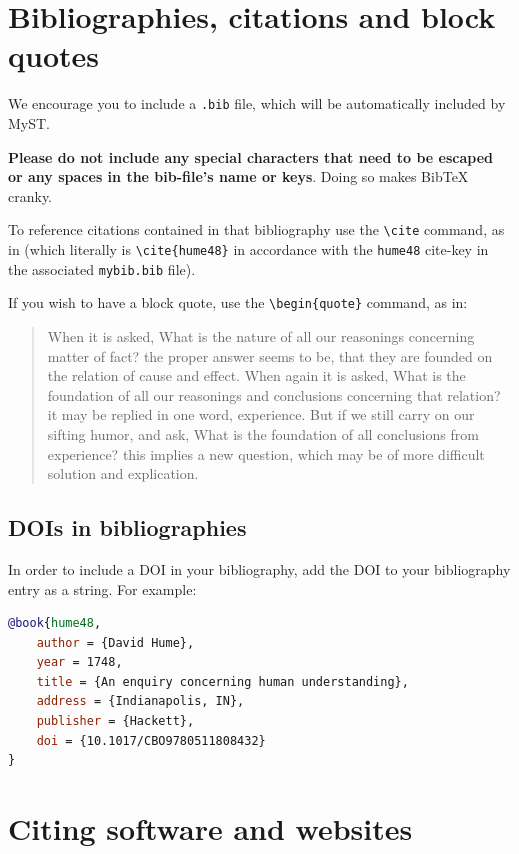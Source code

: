 \section{Bibliographies, citations and block quotes}\label{bibliographies-citations-and-block-quotes}

We encourage you to include a \texttt{.bib} file, which will be automatically included by MyST.

\textbf{Please do not include any special characters that need to be escaped or any spaces in the bib-file's name or keys}. Doing so makes BibTeX cranky.

To reference citations contained in that bibliography use the \verb|\cite| command, as in \citep{hume48} (which literally is \verb|\cite{hume48}| in accordance with the \texttt{hume48} cite-key in the associated \texttt{mybib.bib} file).

If you wish to have a block quote, use the \verb|\begin{quote}| command, as in:

\begin{quote}
    When it is asked, What is the nature of all our reasonings concerning matter of fact? the proper answer seems to be, that they are founded on the relation of cause and effect. When again it is asked, What is the foundation of all our reasonings and conclusions concerning that relation? it may be replied in one word, experience. But if we still carry on our sifting humor, and ask, What is the foundation of all conclusions from experience? this implies a new question, which may be of more difficult solution and explication. \cite{hume48}
\end{quote}

\subsection{DOIs in bibliographies}\label{dois-in-bibliographies}

In order to include a DOI in your bibliography, add the DOI to your bibliography
entry as a string. For example:

\begin{lstlisting}[language=bibtex]
@book{hume48,
    author = {David Hume},
    year = 1748,
    title = {An enquiry concerning human understanding},
    address = {Indianapolis, IN},
    publisher = {Hackett},
    doi = {10.1017/CBO9780511808432}
}
\end{lstlisting}


\section{Citing software and websites}\label{citing-software-and-websites}

